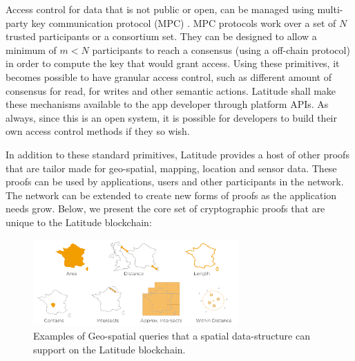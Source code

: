 Access control for data that is not public or open, can be managed using multi-party key communication protocol (MPC)
\cite{enigma, nucypher, mpc_survey}. MPC protocols work over a set of $N$ trusted participants or a consortium set. They
can be designed to allow a minimum of $m<N$ participants to reach a consensus (using a off-chain protocol) in order to
compute the key that would grant access. Using these primitives, it becomes possible to have granular access control,
such as different amount of consensus for read, for writes and other semantic actions. Latitude shall make these
mechanisms available to the app developer through platform APIs. As always, since this is an open system, it is possible
for developers to build their own access control methods if they so wish.

%

In addition to these standard primitives, Latitude provides a host of other proofs that are tailor made
for geo-spatial, mapping, location and sensor data. These proofs can be used by applications, users and
other participants in the network. The network can be extended to create new forms of proofs as the application needs
grow. Below, we present the core set of cryptographic proofs that are unique to the Latitude blockchain:

\begin{figure}[t]
    \centering
    \includegraphics[width=0.70\textwidth]{geospatial_query.png}
  \caption{Examples of Geo-spatial queries that a spatial data-structure can support on the Latitude blockchain.}
    \label{fig:geo_spatial_query}
\end{figure}

